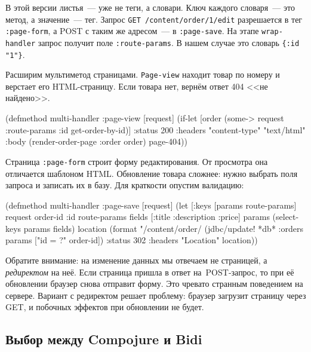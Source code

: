 В этой версии листья~--- уже не теги, а словари. Ключ каждого словаря~--- это метод, а
значение~--- тег. Запрос \verb|GET /content/order/1/edit| разрешается в тег
\verb|:page-form|, а POST с таким же адресом~--- в \verb|:page-save|.  На
этапе \verb|wrap-handler| запрос получит поле \verb|:route-params|. В нашем
случае это словарь \verb|{:id "1"}|.


Расширим мультиметод страницами. \verb|Page-view| находит товар по номеру и
верстает его HTML-страницу. Если товара нет, вернём ответ 404 <<не
найдено>>.

\begin{english}
  \begin{clojure}
(defmethod multi-handler :page-view
  [request]
  (if-let [order (some-> request
                         :route-params
                         :id
                         get-order-by-id)]
    {:status 200
     :headers {"content-type" "text/html"}
     :body (render-order-page {:order order})}
    page-404))
  \end{clojure}
\end{english}

Страница \verb|:page-form| строит форму редактирования. От просмотра она
отличается шаблоном HTML. Обновление товара сложнее: нужно выбрать поля запроса
и записать их в базу. Для краткости опустим валидацию:

\begin{english}
  \begin{clojure}
(defmethod multi-handler :page-save
  [request]
  (let [{:keys [params route-params]} request
        {order-id :id} route-params
        fields [:title :description :price]
        params (select-keys params fields)
        location (format "/content/order/%
    (jdbc/update! *db* :orders params ["id = ?" order-id])
    {:status 302
     :headers {"Location" location}}))
  \end{clojure}
\end{english}


Обратите внимание: на изменение данных мы отвечаем не страницей, а
\emph{редиректом} на неё. Если страница пришла в ответ на~POST-запрос, то
при её обновлении браузер снова отправит форму. Это чревато странным
поведением на сервере. Вариант с редиректом решает проблему: браузер загрузит
страницу через GET, и побочных эффектов при обновлении не будет.

\subsection{Выбор между Compojure и Bidi}

